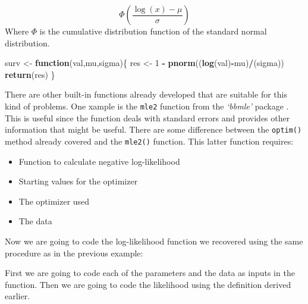 \documentclass[]{book}
\newenvironment{Shaded}{\begin{snugshade}}{\end{snugshade}}
\newcommand{\KeywordTok}[1]{\textcolor[rgb]{0.13,0.29,0.53}{\textbf{#1}}}
\newcommand{\DecValTok}[1]{\textcolor[rgb]{0.00,0.00,0.81}{#1}}
\newcommand{\StringTok}[1]{\textcolor[rgb]{0.31,0.60,0.02}{#1}}
\newcommand{\ControlFlowTok}[1]{\textcolor[rgb]{0.13,0.29,0.53}{\textbf{#1}}}
\newcommand{\OperatorTok}[1]{\textcolor[rgb]{0.81,0.36,0.00}{\textbf{#1}}}
\newcommand{\NormalTok}[1]{#1}
\begin{document}
\[\Phi \left( \frac{\log(x) - \mu}{\sigma} \right)\] Where \(\Phi\) is
the cumulative distribution function of the standard normal
distribution.

\begin{Shaded}
\begin{Highlighting}[]
\NormalTok{surv <-}\StringTok{ }\ControlFlowTok{function}\NormalTok{(val,mu,sigma)\{}
\NormalTok{        res <-}\StringTok{ }\DecValTok{1} \OperatorTok{-}\StringTok{ }\KeywordTok{pnorm}\NormalTok{((}\KeywordTok{log}\NormalTok{(val)}\OperatorTok{-}\NormalTok{mu)}\OperatorTok{/}\NormalTok{(sigma))}
        \KeywordTok{return}\NormalTok{(res)}
\NormalTok{\}}
\end{Highlighting}
\end{Shaded}

There are other built-in functions already developed that are suitable
for this kind of problems. One xample is the \texttt{mle2} function from
the \emph{`bbmle'} package \citep{R-bbmle}. This is useful since the
function deals with standard errors and provides other information that
might be useful. There are some difference between the \texttt{optim()}
method already covered and the \texttt{mle2()} function. This latter
function requires:

\begin{itemize}
\item
  Function to calculate negative log-likelihood
\item
  Starting values for the optimizer
\item
  The optimizer used
\item
  The data
\end{itemize}

Now we are going to code the log-likelihood function we recovered using
the same procedure as in the previous example:

First we are going to code each of the parameters and the data as inputs
in the function. Then we are going to code the likelihood using the
definition derived earlier.
\end{document}
